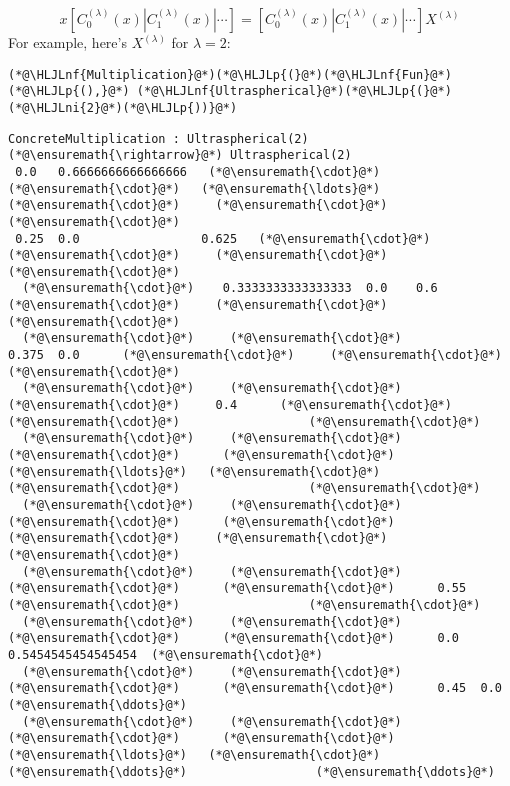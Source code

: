 \documentclass[12pt,a4paper]{article}
\newcommand{\HLJLnf}[1]{\textcolor[RGB]{66,102,213}{#1}}
\newcommand{\HLJLni}[1]{\textcolor[RGB]{59,151,46}{#1}}
\newcommand{\HLJLp}[1]{#1}
\begin{document}
\[
x\left[ C^{(\lambda)}_0(x) | C^{(\lambda)}_1(x) | \cdots  \right] = \left[ C^{(\lambda)}_0(x) | C^{(\lambda)}_1(x) | \cdots  \right]X^{(\lambda)}
\]
For example, here's $X^{(\lambda)}$ for $\lambda = 2$:


\begin{lstlisting}
(*@\HLJLnf{Multiplication}@*)(*@\HLJLp{(}@*)(*@\HLJLnf{Fun}@*)(*@\HLJLp{(),}@*) (*@\HLJLnf{Ultraspherical}@*)(*@\HLJLp{(}@*)(*@\HLJLni{2}@*)(*@\HLJLp{))}@*)
\end{lstlisting}

\begin{lstlisting}
ConcreteMultiplication : Ultraspherical(2) (*@\ensuremath{\rightarrow}@*) Ultraspherical(2)
 0.0   0.6666666666666666   (*@\ensuremath{\cdot}@*)      (*@\ensuremath{\cdot}@*)   (*@\ensuremath{\ldots}@*)   (*@\ensuremath{\cdot}@*)     (*@\ensuremath{\cdot}@*)                  (*@\ensuremath{\cdot}@*)
 0.25  0.0                 0.625   (*@\ensuremath{\cdot}@*)       (*@\ensuremath{\cdot}@*)     (*@\ensuremath{\cdot}@*)                  (*@\ensuremath{\cdot}@*)
  (*@\ensuremath{\cdot}@*)    0.3333333333333333  0.0    0.6      (*@\ensuremath{\cdot}@*)     (*@\ensuremath{\cdot}@*)                  (*@\ensuremath{\cdot}@*)
  (*@\ensuremath{\cdot}@*)     (*@\ensuremath{\cdot}@*)                  0.375  0.0      (*@\ensuremath{\cdot}@*)     (*@\ensuremath{\cdot}@*)                  (*@\ensuremath{\cdot}@*)
  (*@\ensuremath{\cdot}@*)     (*@\ensuremath{\cdot}@*)                   (*@\ensuremath{\cdot}@*)     0.4      (*@\ensuremath{\cdot}@*)     (*@\ensuremath{\cdot}@*)                  (*@\ensuremath{\cdot}@*)
  (*@\ensuremath{\cdot}@*)     (*@\ensuremath{\cdot}@*)                   (*@\ensuremath{\cdot}@*)      (*@\ensuremath{\cdot}@*)   (*@\ensuremath{\ldots}@*)   (*@\ensuremath{\cdot}@*)     (*@\ensuremath{\cdot}@*)                  (*@\ensuremath{\cdot}@*)
  (*@\ensuremath{\cdot}@*)     (*@\ensuremath{\cdot}@*)                   (*@\ensuremath{\cdot}@*)      (*@\ensuremath{\cdot}@*)       (*@\ensuremath{\cdot}@*)     (*@\ensuremath{\cdot}@*)                  (*@\ensuremath{\cdot}@*)
  (*@\ensuremath{\cdot}@*)     (*@\ensuremath{\cdot}@*)                   (*@\ensuremath{\cdot}@*)      (*@\ensuremath{\cdot}@*)      0.55   (*@\ensuremath{\cdot}@*)                  (*@\ensuremath{\cdot}@*)
  (*@\ensuremath{\cdot}@*)     (*@\ensuremath{\cdot}@*)                   (*@\ensuremath{\cdot}@*)      (*@\ensuremath{\cdot}@*)      0.0   0.5454545454545454  (*@\ensuremath{\cdot}@*)
  (*@\ensuremath{\cdot}@*)     (*@\ensuremath{\cdot}@*)                   (*@\ensuremath{\cdot}@*)      (*@\ensuremath{\cdot}@*)      0.45  0.0                 (*@\ensuremath{\ddots}@*)
  (*@\ensuremath{\cdot}@*)     (*@\ensuremath{\cdot}@*)                   (*@\ensuremath{\cdot}@*)      (*@\ensuremath{\cdot}@*)   (*@\ensuremath{\ldots}@*)   (*@\ensuremath{\cdot}@*)     (*@\ensuremath{\ddots}@*)                  (*@\ensuremath{\ddots}@*)
\end{lstlisting}
\end{document}
